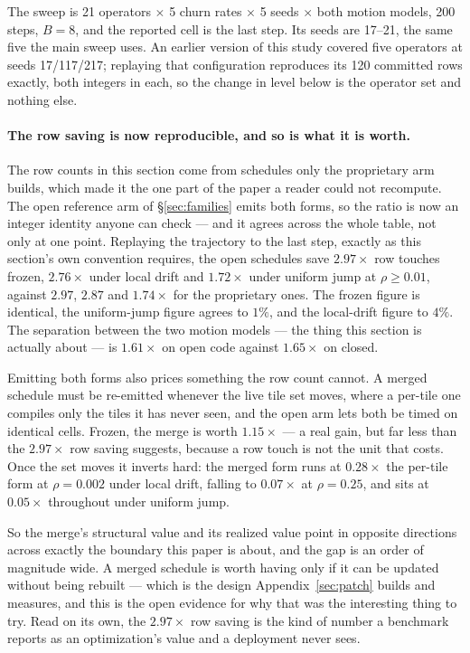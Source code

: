 \documentclass{article}
\begin{document}
The sweep is 21 operators $\times$ 5 churn rates $\times$ 5 seeds $\times$ both
motion models, 200 steps, $B{=}8$, and the reported cell is the last step. Its
seeds are 17--21, the same five the main sweep uses. An earlier version of this
study covered five operators at seeds 17/117/217; replaying that configuration
reproduces its 120 committed rows exactly, both integers in each, so the change
in level below is the operator set and nothing else.

\paragraph{The row saving is now reproducible, and so is what it is worth.}
The row counts in this section come from schedules only the proprietary arm
builds, which made it the one part of the paper a reader could not recompute. The open
reference arm of \S\ref{sec:families} emits both forms, so the ratio is now an
integer identity anyone can check --- and it agrees across the whole table, not
only at one point. Replaying the trajectory to the last step, exactly as this
section's own convention requires, the open schedules save $2.97\times$ row
touches frozen, $2.76\times$ under local drift and $1.72\times$ under uniform
jump at $\rho \geq 0.01$, against $2.97$, $2.87$ and $1.74\times$ for the
proprietary ones. The frozen figure is identical, the uniform-jump figure agrees
to $1\%$, and the local-drift figure to $4\%$. The separation between the two
motion models --- the thing this section is actually about --- is $1.61\times$
on open code against $1.65\times$ on closed.

Emitting both forms also prices something the row count cannot. A merged
schedule must be re-emitted whenever the live tile set moves, where a per-tile
one compiles only the tiles it has never seen, and the open arm lets both be
timed on identical cells. Frozen, the merge is worth $1.15\times$ --- a real
gain, but far less than the $2.97\times$ row saving suggests, because a row
touch is not the unit that costs. Once the set moves it inverts hard: the merged
form runs at $0.28\times$ the per-tile form at $\rho{=}0.002$ under local drift,
falling to $0.07\times$ at $\rho{=}0.25$, and sits at $0.05\times$ throughout
under uniform jump.

So the merge's structural value and its realized value point in opposite
directions across exactly the boundary this paper is about, and the gap is an
order of magnitude wide. A merged schedule is worth having only if it can be
updated without being rebuilt --- which is the design Appendix~\ref{sec:patch}
builds and measures, and this is the open evidence for why that was the
interesting thing to try. Read on its own, the $2.97\times$ row saving is the
kind of number a benchmark reports as an optimization's value and a deployment
never sees.
\end{document}
